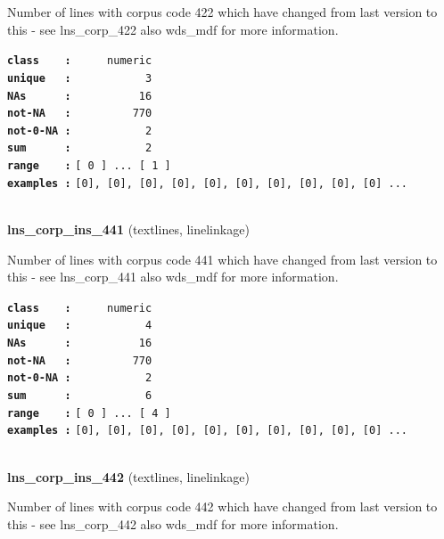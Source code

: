 \documentclass[]{article}
\begin{document}
Number of lines with corpus code 422 which have changed from last
version to this - see lns\_corp\_422 also wds\_mdf for more information.

\textbf{\texttt{class\ \ \ \ :}} \texttt{~~~~~numeric}\\
\textbf{\texttt{unique\ \ \ :}} \texttt{~~~~~~~~~~~3}\\
\textbf{\texttt{NAs\ \ \ \ \ \ :}} \texttt{~~~~~~~~~~16}\\
\textbf{\texttt{not-NA\ \ \ :}} \texttt{~~~~~~~~~770}\\
\textbf{\texttt{not-0-NA\ :}} \texttt{~~~~~~~~~~~2}\\
\textbf{\texttt{sum\ \ \ \ \ \ :}} \texttt{~~~~~~~~~~~2}\\
\textbf{\texttt{range\ \ \ \ :}}
\texttt{{[}\ 0\ {]}\ ...\ {[}\ 1\ {]}}\\
\textbf{\texttt{examples\ :}}
\texttt{{[}0{]},\ {[}0{]},\ {[}0{]},\ {[}0{]},\ {[}0{]},\ {[}0{]},\ {[}0{]},\ {[}0{]},\ {[}0{]},\ {[}0{]}\ ...}\\

~

\textbf{lns\_corp\_ins\_441} (textlines, linelinkage)

Number of lines with corpus code 441 which have changed from last
version to this - see lns\_corp\_441 also wds\_mdf for more information.

\textbf{\texttt{class\ \ \ \ :}} \texttt{~~~~~numeric}\\
\textbf{\texttt{unique\ \ \ :}} \texttt{~~~~~~~~~~~4}\\
\textbf{\texttt{NAs\ \ \ \ \ \ :}} \texttt{~~~~~~~~~~16}\\
\textbf{\texttt{not-NA\ \ \ :}} \texttt{~~~~~~~~~770}\\
\textbf{\texttt{not-0-NA\ :}} \texttt{~~~~~~~~~~~2}\\
\textbf{\texttt{sum\ \ \ \ \ \ :}} \texttt{~~~~~~~~~~~6}\\
\textbf{\texttt{range\ \ \ \ :}}
\texttt{{[}\ 0\ {]}\ ...\ {[}\ 4\ {]}}\\
\textbf{\texttt{examples\ :}}
\texttt{{[}0{]},\ {[}0{]},\ {[}0{]},\ {[}0{]},\ {[}0{]},\ {[}0{]},\ {[}0{]},\ {[}0{]},\ {[}0{]},\ {[}0{]}\ ...}\\

~

\textbf{lns\_corp\_ins\_442} (textlines, linelinkage)

Number of lines with corpus code 442 which have changed from last
version to this - see lns\_corp\_442 also wds\_mdf for more information.
\end{document}
